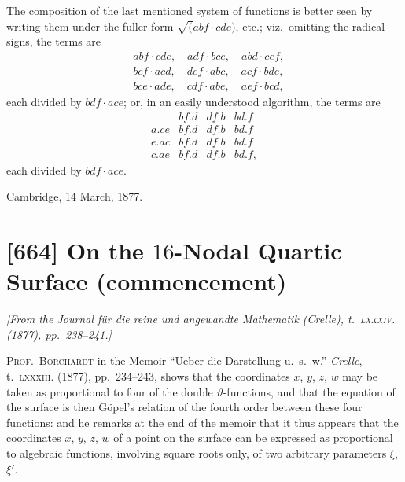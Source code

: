 \documentclass[11pt,a4paper]{article}
\theoremstyle{plain}
\theoremstyle{definition}
\newcommand{\te}{\vartheta} %
\begin{document}
The composition of the last mentioned system of functions is better seen by writing them under the fuller form $\surd(abf \cdot cde)$, etc.; viz.~omitting the radical signs, the terms are
\begin{align*}
& abf \cdot cde, \quad adf \cdot bce, \quad abd \cdot cef, \\
& bcf \cdot acd, \quad def \cdot abc, \quad acf \cdot bde, \\
& bce \cdot ade, \quad cdf \cdot abe, \quad aef \cdot bcd,
\end{align*}
each divided by $bdf \cdot ace$; or, in an easily understood algorithm, the terms are
\[
\begin{array}{c|ccc}
& bf.d & df.b & bd.f \\ \hline
a.ce & bf.d & df.b & bd.f \\
e.ac & bf.d & df.b & bd.f \\
c.ae & bf.d & df.b & bd.f,
\end{array}
\]
each divided by $bdf \cdot ace$.

\begin{flushright}
Cambridge, 14 March, 1877.
\end{flushright}

\newpage
\section{[664] On the $16$-Nodal Quartic Surface (commencement)}
\label{sec:664}

\noindent\textit{[From the \emph{Journal f\"ur die reine und angewandte Mathematik} (Crelle), t.~\textsc{lxxxiv}. (1877), pp.~238--241.]}

\medskip

\textsc{Prof.~Borchardt} in the Memoir ``Ueber die Darstellung u.~s.~w.'' \emph{Crelle}, t.~\textsc{lxxxiii}. (1877), pp.~234--243, shows that the coordinates $x$, $y$, $z$, $w$ may be taken as proportional to four of the double $\te$-functions, and that the equation of the surface is then G\"{o}pel's relation of the fourth order between these four functions: and he remarks at the end of the memoir that it thus appears that the coordinates $x$, $y$, $z$, $w$ of a point on the surface can be expressed as proportional to algebraic functions, involving square roots only, of two arbitrary parameters $\xi$, $\xi'$.
\end{document}
